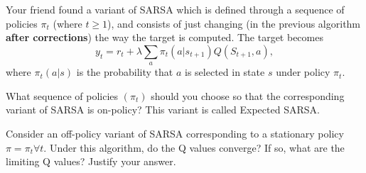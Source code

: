 \documentclass[12pt]{exam}
\begin{document}
 
\begin{question}{60}
  Your friend found a variant of SARSA which is defined through a sequence of policies $\pi_t$ (where $t\ge 1$), and consists of just changing (in the previous algorithm {\bf after corrections}) the way the target is computed. The target becomes
  $$
  y_t = r_t + \lambda \sum_a \pi_t(a|s_{t+1})Q(S_{t+1},a),
  $$
  where $\pi_t(a|s)$  is the probability that $a$ is selected in state $s$ under policy $\pi_t.$

  \begin{subquestion}
    What sequence of policies $(\pi_t)$ %
    should you choose so that the corresponding variant of SARSA is on-policy?
    This variant is called Expected SARSA.
  \begin{minipage}[t][1in]{\linewidth}
  \end{minipage}
  \end{subquestion}
  
  \begin{subquestion}
    Consider an off-policy variant of SARSA corresponding to a stationary policy $\pi=\pi_t \forall t.$ Under this algorithm, do the Q values converge? If so, what are the limiting Q values?  Justify your answer.
  \begin{minipage}[t][1in]{\linewidth}
  \end{minipage}
  \end{subquestion}

\end{question}







\end{document}

